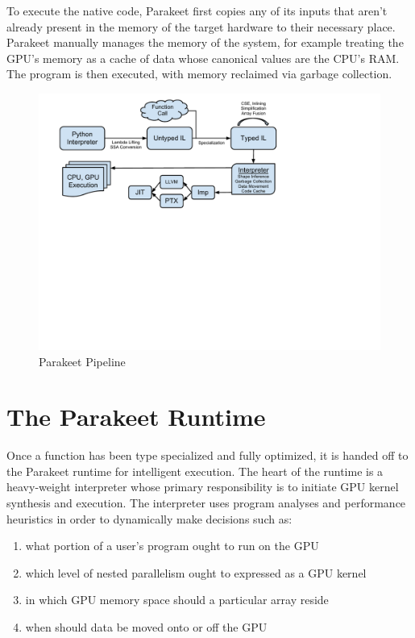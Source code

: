 \documentclass[10pt,twocolumn]{article}
\begin{document}
To execute the native code, Parakeet first copies any of its inputs that aren't already present in the memory of the target hardware to their necessary place.  Parakeet manually manages the memory of the system, for example treating the GPU's memory as a cache of data whose canonical values are the CPU's RAM. The program is then executed, with memory reclaimed via garbage collection.

\begin{figure}[t!bh]
\begin{center}
\leavevmode
\includegraphics[scale=0.6, trim=0pt 310pt 140pt 80pt]{ParakeetNumPyOverview.pdf}
\end{center}
\caption{Parakeet Pipeline}
\label{fig:overview}
\end{figure}

\section{The Parakeet Runtime}
\label{runtime}

Once a function has been type specialized and fully optimized, it is handed off to the Parakeet runtime for intelligent execution. The heart of the runtime is a heavy-weight interpreter whose primary responsibility is to initiate GPU kernel synthesis and execution. The interpreter uses program analyses and performance heuristics in order to dynamically make decisions such as: 
\begin{enumerate}
\item what portion of a user's program ought to run on the GPU 
\item which level of nested parallelism ought to expressed as a GPU kernel
\item in which GPU memory space should a particular array reside 
\item when should data be moved onto or off the GPU
\end{enumerate} 
\end{document}
